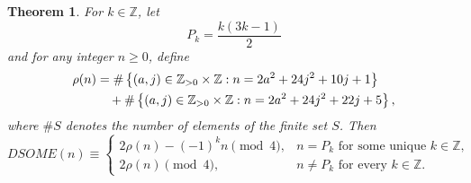\documentclass[12pt]{article}
\numberwithin{equation}{section}
\newtheorem{theorem}{Theorem}[section]
\theoremstyle{definition}
\theoremstyle{remark}
\numberwithin{equation}{section}
\begin{document}
\begin{theorem}\label{DSGTHM}
For $k\in\mathbb Z$, let
\begin{equation*}
P_k=\dfrac{k(3k-1)}{2} 
\end{equation*}
 and for any integer $n\ge 0$, define
\begin{align*}
\rho(n)
&=
\#\left\{
(a,j)\in\mathbb Z_{>0}\times\mathbb Z:
n=2a^2+24j^2+10j+1
\right\}
\notag\\
&\quad+
\#\left\{
(a,j)\in\mathbb Z_{>0}\times\mathbb Z:
n=2a^2+24j^2+22j+5
\right\},
\end{align*}
where $\#S$ denotes the number of elements of the finite set $S$.
Then
$$DSOME(n)
\equiv
\begin{cases}
2\rho(n)-(-1)^kn\pmod4,
& n=P_k\text{ for some unique }k\in\mathbb Z,\\[2mm]
2\rho(n) \pmod4,
& n\neq P_k\text{ for every }k\in\mathbb Z.
\end{cases}$$
\end{theorem}
\end{document}
